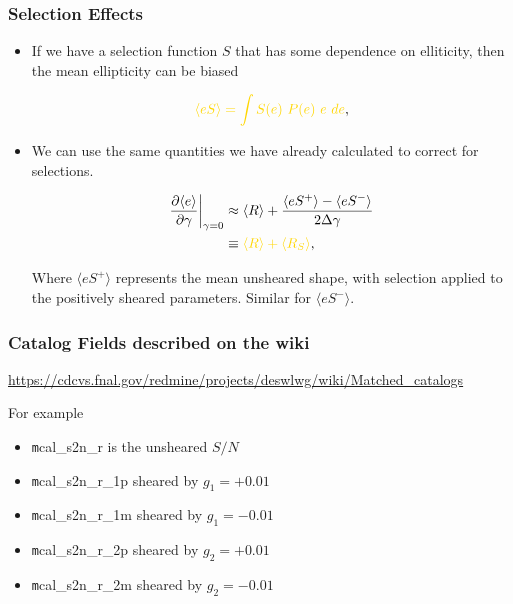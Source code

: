 \documentclass{beamer}
\newcommand{\snr}{$S/N$}
\newcommand{\mest}{e}
\newcommand{\mcalRS}{$R_{S}$}
\begin{document}
\frame
{
    \frametitle{Selection Effects}

 
    \begin{itemize}

        \item If we have a selection function $S$ that has some dependence
            on elliticity, then the mean ellipticity
            can be biased

            \begin{align}
                {\color{gold} \langle \mest S \rangle = \int S(\mest)~P(\mest)~\mest~d\mest},
            \end{align}


        \item We can use the same quantities we have already calculated
            to correct for selections. 

            \begin{align}
                \frac{\partial \langle \mest \rangle}{\partial \gamma}\bigg|_{\gamma=0} &\approx
                \langle R \rangle + \frac{\langle \mest S^+ \rangle - \langle \mest S^- \rangle}{2 \Delta \gamma} \nonumber \\
                &\equiv {\color{gold} \langle R \rangle + \langle \mbox{\mcalRS} \rangle},
            \end{align}

            Where $\langle e S^+ \rangle$ represents the mean unsheared shape, with selection
            applied to the positively sheared parameters.  Similar for $\langle e S^- \rangle$.

    \end{itemize}

}

\frame
{
    \frametitle{Catalog Fields described on the wiki}


    {\small
    \href{https://cdcvs.fnal.gov/redmine/projects/deswlwg/wiki/Matched\_catalogs}{https://cdcvs.fnal.gov/redmine/projects/deswlwg/wiki/Matched\_catalogs}
    }

    For example
    \begin{itemize}
        \item {\color{gold} {\texttt mcal\_s2n\_r}} is the unsheared \snr\
        \item {\color{gold} {\texttt mcal\_s2n\_r\_1p}} sheared by $g_1  = +0.01$
        \item {\color{gold} {\texttt mcal\_s2n\_r\_1m}} sheared by $g_1  = -0.01$
        \item {\color{gold} {\texttt mcal\_s2n\_r\_2p}} sheared by $g_2  = +0.01$
        \item {\color{gold} {\texttt mcal\_s2n\_r\_2m}} sheared by $g_2  = -0.01$
    \end{itemize}
}
\end{document}

